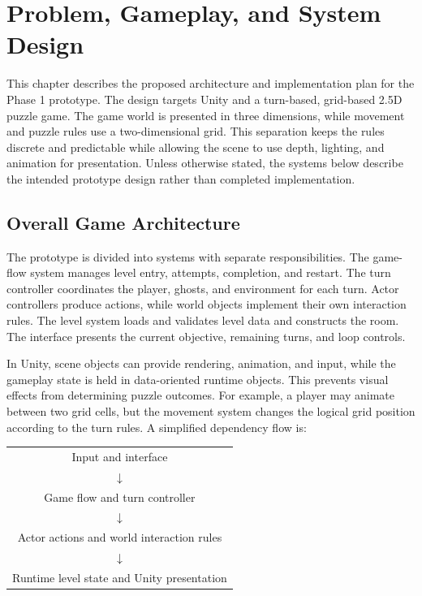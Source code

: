 ﻿\section{Problem, Gameplay, and System Design}

This chapter describes the proposed architecture and implementation plan for the Phase 1 prototype. The design targets Unity and a turn-based, grid-based 2.5D puzzle game. The game world is presented in three dimensions, while movement and puzzle rules use a two-dimensional grid. This separation keeps the rules discrete and predictable while allowing the scene to use depth, lighting, and animation for presentation. Unless otherwise stated, the systems below describe the intended prototype design rather than completed implementation.

\subsection{Overall Game Architecture}

The prototype is divided into systems with separate responsibilities. The game-flow system manages level entry, attempts, completion, and restart. The turn controller coordinates the player, ghosts, and environment for each turn. Actor controllers produce actions, while world objects implement their own interaction rules. The level system loads and validates level data and constructs the room. The interface presents the current objective, remaining turns, and loop controls.

In Unity, scene objects can provide rendering, animation, and input, while the gameplay state is held in data-oriented runtime objects. This prevents visual effects from determining puzzle outcomes. For example, a player may animate between two grid cells, but the movement system changes the logical grid position according to the turn rules. A simplified dependency flow is:

\begin{center}
\begin{tabular}{c}
Input and interface \\ $\downarrow$ \\ Game flow and turn controller \\ $\downarrow$ \\ Actor actions and world interaction rules \\ $\downarrow$ \\ Runtime level state and Unity presentation
\end{tabular}
\end{center}

